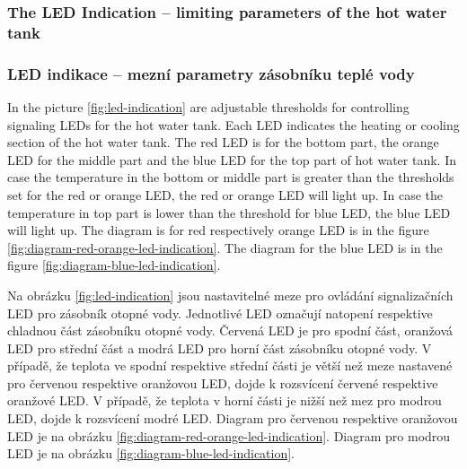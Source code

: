 \begin{Czech}
\end{Czech}


\begin{English}
\subsubsection{The LED Indication – limiting parameters of the hot water tank}
\end{English}

\begin{Czech}
\subsubsection{LED indikace – mezní parametry zásobníku teplé vody}
\end{Czech}
\label{sec:led-indication}


\begin{English}
In the picture \ref{fig:led-indication} are adjustable thresholds for controlling signaling LEDs for the hot water tank. Each LED indicates the heating or cooling section of the hot water tank. The red LED is for the bottom part, the orange LED for the middle part and the blue LED for the top part of hot water tank. In case the temperature in the bottom or middle part is greater than the thresholds set for the red or orange LED, the red or orange LED will light up. In case the temperature in top part is lower than the threshold for blue LED, the blue LED will light up. The diagram is for red respectively orange LED is in the figure \ref{fig:diagram-red-orange-led-indication}. The diagram for the blue LED is in the figure \ref{fig:diagram-blue-led-indication}.
\end{English}

\begin{Czech}
Na obrázku \ref{fig:led-indication} jsou nastavitelné meze pro ovládání signalizačních LED pro zásobník otopné vody. Jednotlivé LED označují natopení respektive chladnou část zásobníku otopné vody. Červená LED je pro spodní část, oranžová LED pro střední část a modrá LED pro horní část zásobníku otopné vody. V případě, že teplota ve spodní respektive střední části je větší než meze nastavené pro červenou respektive oranžovou LED, dojde k rozsvícení červené respektive oranžové LED. V případě, že teplota v horní části je nižší než mez pro modrou LED, dojde k rozsvícení modré LED. Diagram pro červenou respektive oranžovou LED je na obrázku \ref{fig:diagram-red-orange-led-indication}. Diagram pro modrou LED je na obrázku \ref{fig:diagram-blue-led-indication}.
\end{Czech}


